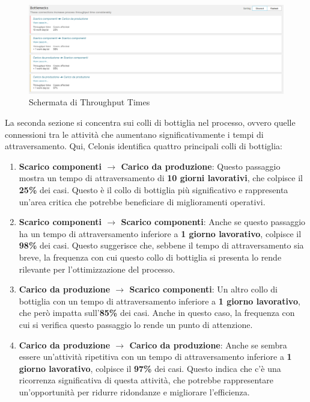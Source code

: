 \documentclass{article}
\begin{document}
\begin{figure}[H]
    \centering
    \includegraphics[width=\textwidth]{imgCelonis/DatiReali/ProcessThroughputTimes2.png}
    \caption{Schermata di Throughput Times}
    \label{fig:schermata-Throughput-Times}
\end{figure}
La seconda sezione si concentra sui colli di bottiglia nel processo, ovvero quelle connessioni tra le attività che aumentano significativamente i tempi di attraversamento. Qui, Celonis identifica quattro principali colli di bottiglia:
\begin{enumerate}
    \item \textbf{Scarico componenti $\rightarrow$ Carico da produzione}: Questo passaggio mostra un tempo di attraversamento di \textbf{10 giorni lavorativi}, che colpisce il \textbf{25\%} dei casi. Questo è il collo di bottiglia più significativo e rappresenta un'area critica che potrebbe beneficiare di miglioramenti operativi.
    
    \item \textbf{Scarico componenti $\rightarrow$ Scarico componenti}: Anche se questo passaggio ha un tempo di attraversamento inferiore a \textbf{1 giorno lavorativo}, colpisce il \textbf{98\%} dei casi. Questo suggerisce che, sebbene il tempo di attraversamento sia breve, la frequenza con cui questo collo di bottiglia si presenta lo rende rilevante per l'ottimizzazione del processo.
    
    \item \textbf{Carico da produzione $\rightarrow$ Scarico componenti}: Un altro collo di bottiglia con un tempo di attraversamento inferiore a \textbf{1 giorno lavorativo}, che però impatta sull'\textbf{85\%} dei casi. Anche in questo caso, la frequenza con cui si verifica questo passaggio lo rende un punto di attenzione.
    
    \item \textbf{Carico da produzione $\rightarrow$ Carico da produzione}: Anche se sembra essere un'attività ripetitiva con un tempo di attraversamento inferiore a \textbf{1 giorno lavorativo}, colpisce il \textbf{97\%} dei casi. Questo indica che c'è una ricorrenza significativa di questa attività, che potrebbe rappresentare un'opportunità per ridurre ridondanze e migliorare l'efficienza.
\end{enumerate}
\end{document}
